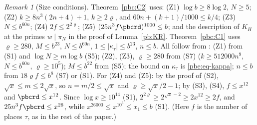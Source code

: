 \documentclass[10pt]{amsart}
\theoremstyle{definition}
\theoremstyle{remark}
\newtheorem{remark}[theorem]{Remark}
\providecommand{\aubar}[1]{\overline{#1}}
\providecommand{\pbDid}{\mathcal D_{\mathrm{id}}}
\providecommand{\pbDmain}{\mathcal D_{\mathrm{main}}}
\providecommand{\pbR}{\overline R_0}
\begin{document}
\begin{remark}[Size conditions]\label{pbc:rem-sizes}
Theorem~\ref{pbc:C2} uses: (Z1) $\log b\ge8\log2$, $N\ge5$; (Z2) $k\ge8n^3(2n+4)+1$, $k\ge2\varrho$,
and $60n+(k+1)/1000\le k/4$; (Z3) $N\le b^{60n}$; (Z4) $2f\le2^{2\varrho}$; (Z5) $(25n^3f\pbcrd)^{1000}\le
b$; and the description of $K_H$ at the primes $w\mid\pi_N$ in the proof of Lemma~\ref{pb:KR}.
Theorem~\ref{pbc:C1} uses $\varrho\ge280$, $M\le b^{23}$, $N\le b^{60n}$, $1\le|\kappa_\tau|\le b^{23}$, $n\le b$.
All follow from {\cite[Lemma~13.4]{P46}}: (Z1) from (S1) and $\log N\ge m\log b$ (S5); (Z2), (Z3),
$\varrho\ge280$ from (S7) ($k\ge512000n^9$, $N\le b^{60n}$, $\varrho\ge10^5$); $M\le b^{22}$ from (S5);
the bound on $\kappa_\tau$ is \eqref{pbe:eq-kappa}; $n\le b$ from $18\varrho f\le b^8$ (S7) or (S1). For (Z4) and (Z5): by the
proof of (S2), $\sqrt x\le m\le2\sqrt x$, so $n=m/2\le\sqrt x$ and $\varrho\ge\sqrt x/2-1$; by (S3),
(S4), $f\le x^{12}$ and $\pbcrd\le x^{12}$. Since $\log x\ge10^{14}$ (S1), $2^{2\varrho}\ge2^{\sqrt x-2}\ge2x^{12}
\ge2f$, and $25n^3f\pbcrd\le x^{26}$, while $x^{26000}\le x^{10^6}\le x_1\le b$ (S1). (Here $f$ is the
number of places $\tau$, as in the rest of the paper.)
\end{remark}



\providecommand{\auO}{\mathcal O}
\providecommand{\auNm}{\operatorname{Nm}}
\providecommand{\auA}{\mathbb A}
\providecommand{\aubar}[1]{\overline{#1}}
\providecommand{\auf}[1]{\texttt{#1}}
\providecommand{\panot}[1]{\par\smallskip{\raggedright\noindent\textbf{[Not proved here:} #1\textbf{]}\par}\smallskip}
\providecommand{\pbR}{\overline R_0}
\providecommand{\pbDid}{\mathcal D_{\mathrm{id}}}
\providecommand{\pbDmain}{\mathcal D_{\mathrm{main}}}
\providecommand{\pbvol}{\operatorname{vol}}
\providecommand{\pbdeg}{\operatorname{deg}}
\providecommand{\pbg}{\mathsf g}
\providecommand{\pbeN}{\mathcal N}
\providecommand{\pbet}{\beta_*}
\providecommand{\pbenp}{\mathsf n_{\mathrm p}}
\providecommand{\pbesz}{\operatorname{size}}
\providecommand{\pbeGs}{\Gamma^*}
\providecommand{\pbeAp}{A^{+}}
\providecommand{\pbel}{\ell}
\providecommand{\pbeL}{\mathsf L}
\providecommand{\pbsv}{\mathsf v}
\providecommand{\pbsK}{\mathsf K}
\providecommand{\pbsF}{\mathcal F}
\providecommand{\pbsO}{\mathcal O}
\providecommand{\pbsrb}{\rho_\square}
\providecommand{\pbsth}{\theta_\square}
\providecommand{\pbsp}{\mathsf p}
\providecommand{\pbsi}{\mathsf i}
\providecommand{\pbsmn}{\mathsf m}
\end{document}
